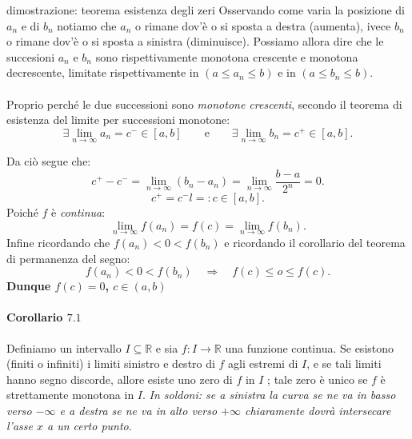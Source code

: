 \documentclass[x11names]{article}
\begin{document}
\begin{es}{dimostrazione: teorema esistenza degli zeri}
		Osservando come varia la posizione di $a_{n}$ e di $b_{n}$ notiamo che $a_{n}$ o rimane dov'è o si sposta a destra (aumenta), ivece $b_{n}$ o rimane dov'è o si sposta a sinistra (diminuisce). Possiamo allora dire che le succesioni ${a_{n}}$ e ${b_{n}}$ sono rispettivamente monotona crescente e monotona decrescente, limitate rispettivamente in $\left(a \leq a_{n} \leq b\right)$ e in $\left(a \leq b_{n} \leq b\right)$.
		\\ \\
		Proprio perché le due successioni sono \textit{monotone crescenti}, secondo il teorema di esistenza del limite per successioni monotone:
		\[
		\exists \lim_{n\to \infty}a_{n} = c^- \in \left[a,b\right] \qquad \text{e} \qquad \exists\lim_{n\to \infty}b_{n} =c^+ \in \left[a,b\right]
		.\] 
		
	\end{es}
	\begin{es}{}
		
		
		Da ciò segue che:
		\[
		c^+ - c^- = \lim_{n\to \infty}\left(b_{n} - a_{n}\right) = \lim_{n\to \infty}\frac{b-a}{2^n} = 0
		.\] 
		\[
		c^+ = c^-l =: c \in \left[a,b\right]
		.\] 
		Poiché $f$ è \textit{continua}:
		\[
		\lim_{n\to \infty}f\left(a_{n}\right)  = f\left(c\right) = \lim_{n\to \infty}f\left(b_{n}\right)
		.\] 
		Infine ricordando che $f\left(a_{n}\right) < 0 < f\left(b_{n}\right)$ e ricordando il corollario del teorema di permanenza del segno:
		\[
		f\left(a_{n}\right) < 0 < f\left(b_{n}\right) \quad \Rightarrow \quad f\left(c\right) \leq o \leq f\left(c\right)
		.\] 
		\textbf{Dunque $f\left(c\right) = 0$, $c \in \left(a,b\right)$ } 
	\end{es}
	
	\paragraph{Corollario $7.1$}
	Definiamo un intervallo $I \subseteq \mathbb{R}$ e sia $f:I \rightarrow \mathbb{R}$ una funzione continua. Se esistono (finiti o infiniti) i limiti sinistro e destro di $f$ agli estremi di $I$, e se tali limiti hanno segno discorde, allore esiste uno zero di $f$ in $I$ ; tale zero è unico se $f$ è strettamente monotona in $I$.
	\textit{In soldoni: se a sinistra la curva se ne va in basso verso $-\infty$ e a destra se ne va in alto verso $+\infty$ chiaramente dovrà intersecare l'asse $x$ a un certo punto}.
	
\end{document}
